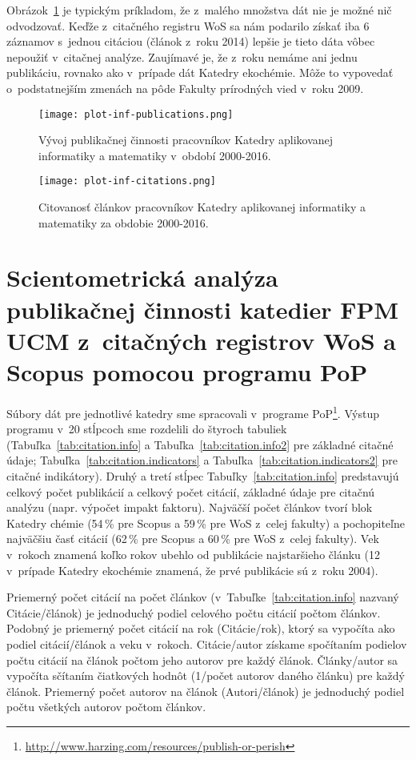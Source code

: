 Obrázok~\ref{fig:plot.inf.publications} je typickým príkladom, že z~malého
množstva dát nie je možné nič odvodzovať.  Keďže z~citačného registru WoS sa nám
podarilo získať iba 6 záznamov s~jednou citáciou (článok z~roku 2014) lepšie je
tieto dáta vôbec nepoužiť v~citačnej analýze.  Zaujímavé je, že z~roku nemáme
ani jednu publikáciu, rovnako ako v~prípade dát Katedry ekochémie.  Môže to
vypovedať o~podstatnejším zmenách na pôde Fakulty prírodných vied v~roku 2009.

\begin{figure}
  \centering
  \texttt{[image: plot-inf-publications.png]}
  \caption{Vývoj publikačnej činnosti pracovníkov Katedry aplikovanej
    informatiky a matematiky v~období 2000-2016.}
  \label{fig:plot.inf.publications}
\end{figure}

\begin{figure}
  \centering
  \texttt{[image: plot-inf-citations.png]}
  \caption{Citovanosť článkov pracovníkov Katedry aplikovanej informatiky a
    matematiky za obdobie 2000-2016.}
  \label{fig:plot.inf.citations}
\end{figure}


\section{Scientometrická analýza publikačnej činnosti katedier FPM UCM
  z~citačných registrov WoS a Scopus pomocou programu PoP}

Súbory dát pre jednotlivé katedry sme spracovali v~programe
PoP\footnote{\url{http://www.harzing.com/resources/publish-or-perish}}.  Výstup
programu v~20 stĺpcoch sme rozdelili do štyroch tabuliek
(Tabuľka~\ref{tab:citation.info} a Tabuľka~\ref{tab:citation.info2} pre základné
citačné údaje; Tabuľka~\ref{tab:citation.indicators} a
Tabuľka~\ref{tab:citation.indicators2} pre citačné indikátory).  Druhý a tretí
stĺpec Tabuľky~\ref{tab:citation.info} predstavujú celkový počet publikácií a
celkový počet citácií, základné údaje pre citačnú analýzu (napr. výpočet impakt
faktoru).  Najväčší počet článkov tvorí blok Katedry chémie (54\,\% pre Scopus a
59\,\% pre WoS z~celej fakulty) a pochopiteľne najväčšiu časť citácií (62\,\%
pre Scopus a 60\,\% pre WoS z~celej fakulty).  Vek v~rokoch znamená koľko rokov
ubehlo od publikácie najstaršieho článku (12 v~prípade Katedry ekochémie
znamená, že prvé publikácie sú z~roku 2004).

Priemerný počet citácií na počet článkov (v~Tabuľke~\ref{tab:citation.info}
nazvaný Citácie/článok) je jednoduchý podiel celového počtu citácií počtom
článkov.  Podobný je priemerný počet citácií na rok (Citácie/rok), ktorý sa
vypočíta ako podiel citácií/článok a veku v~rokoch.  Citácie/autor získame
spočítaním podielov počtu citácií na článok počtom jeho autorov pre každý
článok.  Články/autor sa vypočíta sčítaním čiatkových hodnôt (1/počet autorov
daného článku) pre každý článok.  Priemerný počet autorov na článok
(Autori/článok) je jednoduchý podiel počtu všetkých autorov počtom článkov.
\citep{Harzing2011}

